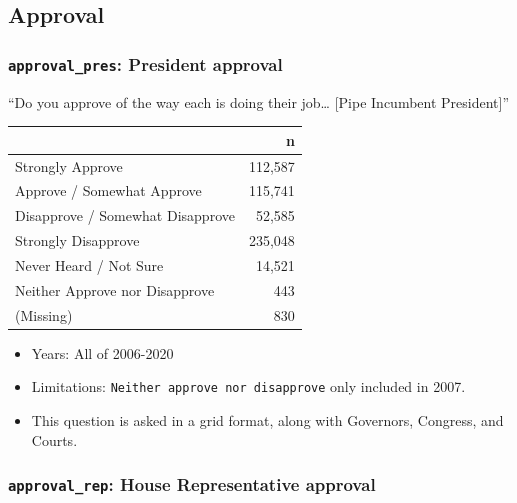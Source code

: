 \documentclass[10pt,article,oneside]{memoir}
\theoremstyle{definition}
\begin{document}
\hypertarget{approval}{%
\subsection{Approval}\label{approval}}

\hypertarget{approval_pres-president-approval}{%
\subsubsection{\texorpdfstring{\texttt{approval\_pres}: President
approval}{approval\_pres: President approval}}\label{approval_pres-president-approval}}

``Do you approve of the way each is doing their job\ldots{} {[}Pipe
Incumbent President{]}''

\begin{table}[H]
\centering
\begin{tabular}[t]{lr}
\toprule
 & n\\
\midrule
Strongly Approve & 112,587\\
Approve / Somewhat Approve & 115,741\\
Disapprove / Somewhat Disapprove & 52,585\\
Strongly Disapprove & 235,048\\
Never Heard / Not Sure & 14,521\\
Neither Approve nor Disapprove & 443\\
(Missing) & 830\\
\bottomrule
\end{tabular}
\end{table}

\begin{itemize}
\tightlist
\item
  Years: All of 2006-2020
\item
  Limitations: \texttt{Neither\ approve\ nor\ disapprove} only included
  in 2007.
\item
  This question is asked in a grid format, along with Governors,
  Congress, and Courts.
\end{itemize}

\hypertarget{approval_rep-house-representative-approval}{%
\subsubsection{\texorpdfstring{\texttt{approval\_rep}: House
Representative
approval}{approval\_rep: House Representative approval}}\label{approval_rep-house-representative-approval}}
\end{document}
